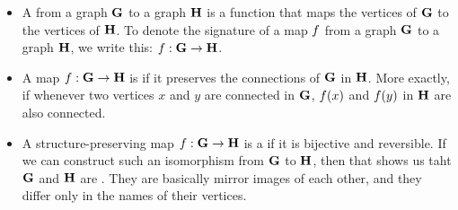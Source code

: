 \documentclass[../../../main.tex]{subfiles}
\begin{document}
\begin{itemize}

  \item A  from a graph $\mathbf{G}$ to a graph $\mathbf{H}$ is a function that maps the vertices of $\mathbf{G}$ to the vertices of $\mathbf{H}$. To denote the signature of a map $f$ from a graph $\mathbf{G}$ to a graph $\mathbf{H}$, we write this: $f: \mathbf{G} \rightarrow \mathbf{H}$.
  
  \item A map $f: \mathbf{G} \rightarrow \mathbf{H}$ is  if it preserves the connections of $\mathbf{G}$ in $\mathbf{H}$. More exactly, if whenever two vertices $x$ and $y$ are connected in $\mathbf{G}$, $f(x)$ and $f(y)$ in $\mathbf{H}$ are also connected.
  
  \item A structure-preserving map $f: \mathbf{G} \rightarrow \mathbf{H}$ is a  if it is bijective and reversible. If we can construct such an isomorphism from $\mathbf{G}$ to $\mathbf{H}$, then that shows us taht $\mathbf{G}$ and $\mathbf{H}$ are . They are basically mirror images of each other, and they differ only in the names of their vertices.

\end{itemize}
\end{document}

